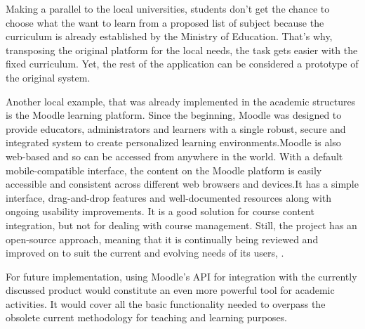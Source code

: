 Making a parallel to the local universities, students don't get the chance to choose what the want to learn from a proposed list of subject because the curriculum is already established by the Ministry of Education. That's why, transposing the original platform for the local needs, the task gets easier with the fixed curriculum. Yet, the rest of the application can be considered a prototype of the original system.

Another local example, that was already implemented in the academic structures is the Moodle learning platform. Since the beginning, Moodle was designed to provide educators, administrators and learners with a single robust, secure and integrated system to create personalized learning environments.Moodle is also web-based and so can be accessed from anywhere in the world. With a default mobile-compatible interface, the content on the Moodle platform is easily accessible and consistent across different web browsers and devices.It has a simple interface, drag-and-drop features and well-documented resources along with ongoing usability improvements. It is a good solution for course content integration, but not for dealing with course management. Still, the project has an open-source approach, meaning that it is continually being reviewed and improved on to suit the current and evolving needs of its users, \cite{Moodle}. 

For future implementation, using Moodle's API for integration with the currently discussed product would constitute an even more powerful tool for academic activities. It would cover all the basic functionality needed to overpass the obsolete current methodology for teaching and learning purposes. 

